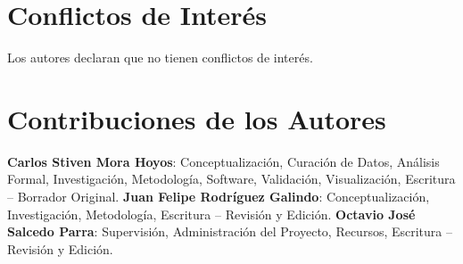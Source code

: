 \documentclass[fleqn,10pt,lineno]{wlpeerj}
\begin{document}
\section*{Conflictos de Inter\'es}

Los autores declaran que no tienen conflictos de inter\'es.

\section*{Contribuciones de los Autores}

\textbf{Carlos Stiven Mora Hoyos}: Conceptualizaci\'on, Curaci\'on de Datos, An\'alisis Formal, Investigaci\'on, Metodolog\'ia, Software, Validaci\'on, Visualizaci\'on, Escritura -- Borrador Original.
\textbf{Juan Felipe Rodr\'iguez Galindo}: Conceptualizaci\'on, Investigaci\'on, Metodolog\'ia, Escritura -- Revisi\'on y Edici\'on.
\textbf{Octavio Jos\'e Salcedo Parra}: Supervisi\'on, Administraci\'on del Proyecto, Recursos, Escritura -- Revisi\'on y Edici\'on.


\end{document}
